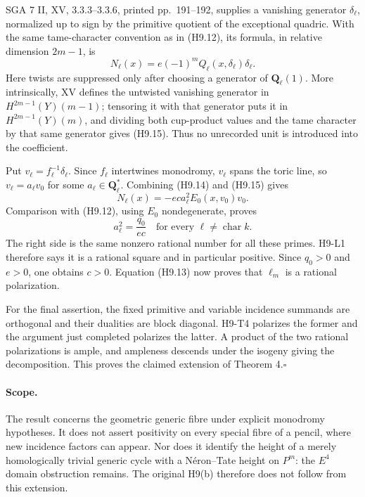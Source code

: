\documentclass[11pt,a4paper]{article}
\begin{document}
SGA 7 II, XV, 3.3.3--3.3.6, printed pp.~191--192, supplies a vanishing generator
$\delta_\ell$, normalized up to sign by the primitive quotient of the
exceptional quadric. With the same tame-character convention as in
(H9.12), its formula, in relative dimension $2m-1$, is
\[
 N_\ell(x)=e(-1)^m Q_\ell(x,\delta_\ell)\delta_\ell.
                                                        \tag{H9.15}
\]
Here twists are suppressed only after choosing a generator of
$\mathbf Q_\ell(1)$. More intrinsically, XV defines the untwisted
vanishing generator in $H^{2m-1}(Y)(m-1)$; tensoring it with that
generator puts it in $H^{2m-1}(Y)(m)$, and dividing both cup-product
values and the tame character by that same generator gives (H9.15).
Thus no unrecorded unit is introduced into the coefficient.

Put $v_\ell=f_\ell^{-1}\delta_\ell$. Since $f_\ell$ intertwines
monodromy, $v_\ell$ spans the toric line, so
$v_\ell=a_\ell v_0$ for some $a_\ell\in\mathbf Q_\ell^*$.
Combining (H9.14) and (H9.15) gives
\[
 N_\ell(x)=-e c a_\ell^2 E_0(x,v_0)v_0.
\]
Comparison with (H9.12), using $E_0$ nondegenerate, proves
\[
 a_\ell^2=\frac{q_0}{e c}\quad\text{for every }\ell\ne
 \operatorname{char}k.                                \tag{H9.16}
\]
The right side is the same nonzero rational number for all these primes.
H9-L1 therefore says it is a rational square and in particular positive.
Since $q_0>0$ and $e>0$, one obtains $c>0$. Equation (H9.13) now proves
that $\ell_m$ is a rational polarization.

For the final assertion, the fixed primitive and variable incidence
summands are orthogonal and their dualities are block diagonal.
H9-T4 polarizes the former and the argument just completed polarizes
the latter. A product of the two rational polarizations is ample,
and ampleness descends under the isogeny giving the decomposition.
This proves the claimed extension of Theorem 4.\hfill$\square$

\paragraph{Scope.}
The result concerns the geometric generic fibre under explicit monodromy
hypotheses. It does not assert positivity on every special fibre of a
pencil, where new incidence factors can appear. Nor does it identify
the height of a merely homologically trivial generic cycle with a
N\'eron--Tate height on $P^m$: the $E^4$ domain obstruction remains.
The original H9(b) therefore does not follow from this extension.
\end{document}
